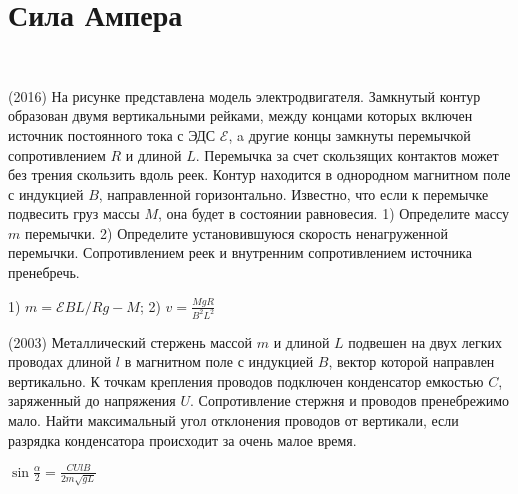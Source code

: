 \section{Сила Ампера}

\begin{ex}
\hspace{0pt} \\
\begin{minipage}{.65\textwidth}
(2016) На рисунке представлена модель электродвигателя. Замкнутый контур образован двумя вертикальными рейками, между концами которых включен источник постоянного тока с ЭДС $\mathcal{E}$, a другие концы замкнуты перемычкой сопротивлением $R$ и длиной $L$. Перемычка за счет скользящих контактов может без трения скользить вдоль реек. Контур находится в однородном магнитном поле с индукцией $B$, направленной горизонтально. Известно, что если к перемычке подвесить груз массы $M$, она будет в состоянии равновесия. 1) Определите массу $m$ перемычки. 2) Определите установившуюся скорость ненагруженной перемычки. Сопротивлением реек и внутренним сопротивлением источника пренебречь.
\end{minipage}
\begin{minipage}{.35\textwidth}
\centering

\end{minipage}
\begin{ans}
1) $m=\mathcal{E}BL/Rg - M$; 2) $v = \frac{MgR}{B^2L^2}$
\end{ans}
\end{ex}

\begin{ex}
(2003) Металлический стержень массой $m$ и длиной $L$ подвешен на двух легких проводах длиной $l$ в магнитном поле с индукцией $B$, 
вектор которой направлен вертикально. К точкам крепления проводов подключен конденсатор емкостью $C$, заряженный до напряжения $U$. 
Сопротивление стержня и проводов пренебрежимо мало. Найти максимальный угол отклонения проводов от вертикали, если разрядка конденсатора происходит за очень малое время.
\begin{ans}
$\sin \frac {\alpha}{2} = \frac{CUlB}{2m \sqrt{gL}}$
\end{ans}
\end{ex}

